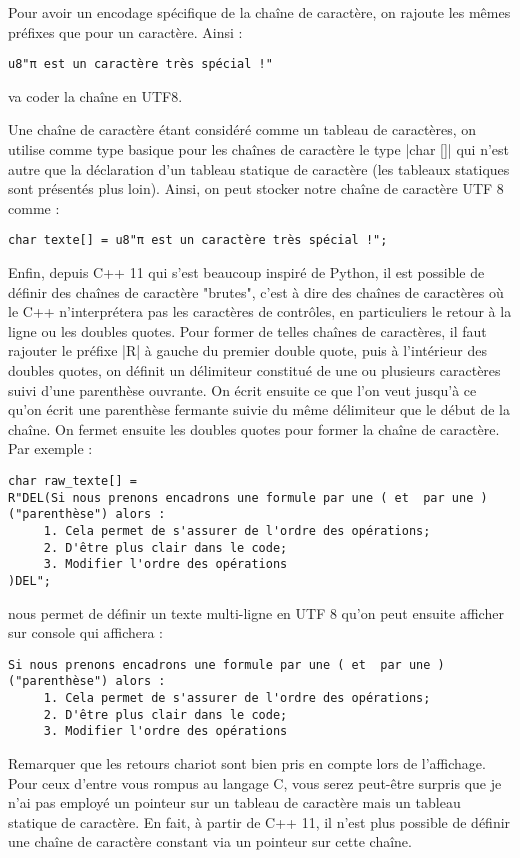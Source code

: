 Pour avoir un encodage spécifique de la chaîne de caractère, on rajoute les mêmes préfixes que pour un caractère.
Ainsi :
\begin{lstlisting}
u8"π est un caractère très spécial !"
\end{lstlisting}
va coder la chaîne en UTF8.

Une chaîne de caractère étant considéré comme un tableau de caractères, on utilise comme type basique pour les chaînes de caractère le type |char []| qui n'est autre que la déclaration d'un tableau statique de caractère (les tableaux statiques sont présentés plus loin). Ainsi, on peut stocker notre chaîne de caractère UTF 8 comme :
\begin{lstlisting}
char texte[] = u8"π est un caractère très spécial !";
\end{lstlisting}

Enfin, depuis C++ 11 qui s'est beaucoup inspiré de Python, il est possible de définir des chaînes de caractère "brutes",
c'est à dire des chaînes de caractères où le C++ n'interprétera pas les caractères de contrôles, en particuliers le retour à la ligne ou les doubles quotes. Pour former de telles chaînes de caractères, il faut rajouter le préfixe |R| à gauche du premier double quote, puis à l'intérieur des doubles quotes, on définit un délimiteur constitué de une ou plusieurs caractères suivi d'une parenthèse ouvrante. On écrit ensuite ce que l'on veut jusqu'à ce qu'on écrit une parenthèse fermante suivie du même délimiteur que le début de la chaîne. On fermet ensuite les doubles quotes pour former la chaîne de caractère. Par exemple :
\begin{lstlisting}
char raw_texte[] = 
R"DEL(Si nous prenons encadrons une formule par une ( et  par une ) ("parenthèse") alors :
     1. Cela permet de s'assurer de l'ordre des opérations;
     2. D'être plus clair dans le code;
     3. Modifier l'ordre des opérations
)DEL";
\end{lstlisting}

nous permet de définir un texte multi-ligne en UTF 8 qu'on peut ensuite afficher sur console qui affichera :
\begin{verbatim}
Si nous prenons encadrons une formule par une ( et  par une ) ("parenthèse") alors :
     1. Cela permet de s'assurer de l'ordre des opérations;
     2. D'être plus clair dans le code;
     3. Modifier l'ordre des opérations
\end{verbatim}

Remarquer que les retours chariot sont bien pris en compte lors de l'affichage. Pour ceux d'entre vous rompus au langage C, vous serez peut-être surpris que je n'ai pas employé un pointeur sur un tableau de caractère mais un tableau statique
de caractère. En fait, à partir de C++ 11, il n'est plus possible de définir une chaîne de caractère constant via un pointeur sur cette chaîne.

